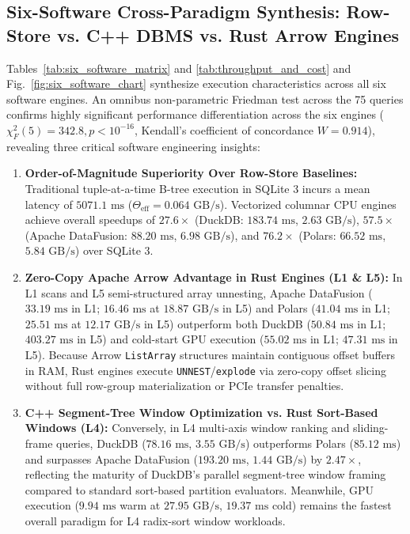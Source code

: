 \documentclass[10pt,a4paper]{article}
\begin{document}
\subsection{Six-Software Cross-Paradigm Synthesis: Row-Store vs. C++ DBMS vs. Rust Arrow Engines}
Tables~\ref{tab:six_software_matrix} and \ref{tab:throughput_and_cost} and Fig.~\ref{fig:six_software_chart} synthesize execution characteristics across all six software engines. An omnibus non-parametric Friedman test across the 75 queries confirms highly significant performance differentiation across the six engines ($\chi^2_F(5) = 342.8, p < 10^{-16}$, Kendall's coefficient of concordance $W = 0.914$), revealing three critical software engineering insights:
\begin{enumerate}[leftmargin=1.5em,itemsep=2pt]
    \item \textbf{Order-of-Magnitude Superiority Over Row-Store Baselines:} Traditional tuple-at-a-time B-tree execution in SQLite 3 incurs a mean latency of $5071.1\text{ ms}$ ($\Theta_{\text{eff}} = 0.064\text{ GB/s}$). Vectorized columnar CPU engines achieve overall speedups of $27.6\times$ (DuckDB: $183.74\text{ ms}$, $2.63\text{ GB/s}$), $57.5\times$ (Apache DataFusion: $88.20\text{ ms}$, $6.98\text{ GB/s}$), and $76.2\times$ (Polars: $66.52\text{ ms}$, $5.84\text{ GB/s}$) over SQLite 3.
    \item \textbf{Zero-Copy Apache Arrow Advantage in Rust Engines (L1 \& L5):} In L1 scans and L5 semi-structured array unnesting, Apache DataFusion ($33.19\text{ ms}$ in L1; $16.46\text{ ms}$ at $18.87\text{ GB/s}$ in L5) and Polars ($41.04\text{ ms}$ in L1; $25.51\text{ ms}$ at $12.17\text{ GB/s}$ in L5) outperform both DuckDB ($50.84\text{ ms}$ in L1; $403.27\text{ ms}$ in L5) and cold-start GPU execution ($55.02\text{ ms}$ in L1; $47.31\text{ ms}$ in L5). Because Arrow \texttt{ListArray} structures maintain contiguous offset buffers in RAM, Rust engines execute \texttt{UNNEST}/\texttt{explode} via zero-copy offset slicing without full row-group materialization or PCIe transfer penalties.
    \item \textbf{C++ Segment-Tree Window Optimization vs. Rust Sort-Based Windows (L4):} Conversely, in L4 multi-axis window ranking and sliding-frame queries, DuckDB ($78.16\text{ ms}$, $3.55\text{ GB/s}$) outperforms Polars ($85.12\text{ ms}$) and surpasses Apache DataFusion ($193.20\text{ ms}$, $1.44\text{ GB/s}$) by $\mathbf{2.47\times}$, reflecting the maturity of DuckDB's parallel segment-tree window framing compared to standard sort-based partition evaluators. Meanwhile, GPU execution ($9.94\text{ ms}$ warm at $27.95\text{ GB/s}$, $19.37\text{ ms}$ cold) remains the fastest overall paradigm for L4 radix-sort window workloads.
\end{enumerate}
\end{document}

